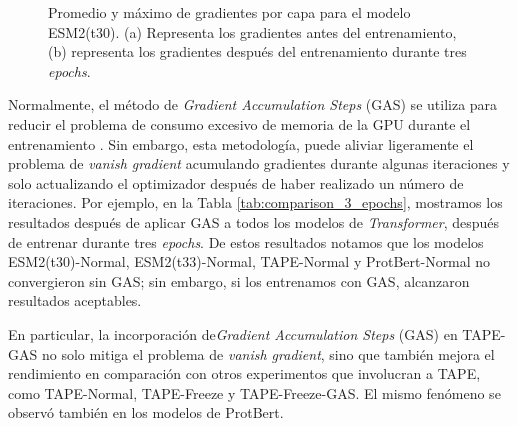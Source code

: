 \begin{figure}[h]
	\centering
	
	
	\caption[Gradientes del modelo ESM2(t30)]{Promedio y máximo de gradientes por capa para el modelo ESM2(t30). (a) Representa los gradientes antes del entrenamiento, (b) representa los gradientes después del entrenamiento durante tres \textit{epochs}.}
	\label{fig:t30}
\end{figure}


Normalmente, el método de \textit{Gradient Accumulation Steps} (GAS) se utiliza  para reducir el problema de consumo excesivo de memoria de la GPU durante el entrenamiento \citep{zhang2023adam,huang2023measuring}. Sin embargo, esta metodología, puede aliviar ligeramente el problema de \textit{vanish gradient} acumulando gradientes durante algunas iteraciones y solo actualizando el optimizador después de haber realizado un número de iteraciones. Por ejemplo, en la Tabla \ref{tab:comparison_3_epochs}, mostramos los resultados después de aplicar GAS a todos los modelos de \textit{Transformer}, después de entrenar durante tres \textit{epochs}. De estos resultados notamos que los modelos ESM2(t30)-Normal, ESM2(t33)-Normal, TAPE-Normal y ProtBert-Normal no convergieron sin GAS; sin embargo, si los entrenamos con GAS, alcanzaron resultados aceptables.

En particular, la incorporación de\textit{Gradient Accumulation Steps} (GAS) en TAPE-GAS no solo mitiga el problema de \textit{vanish gradient}, sino que también mejora el rendimiento en comparación con otros experimentos que involucran a TAPE, como TAPE-Normal, TAPE-Freeze y TAPE-Freeze-GAS. El mismo fenómeno se observó también en los modelos de ProtBert.


